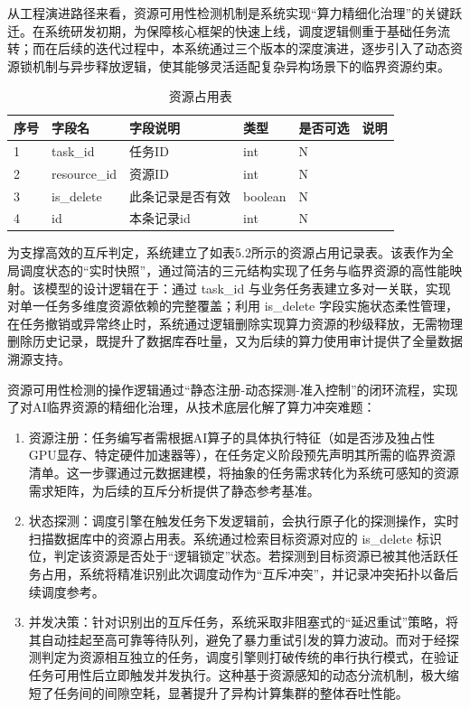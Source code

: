 从工程演进路径来看，资源可用性检测机制是系统实现“算力精细化治理”的关键跃迁。在系统研发初期，为保障核心框架的快速上线，调度逻辑侧重于基础任务流转；而在后续的迭代过程中，本系统通过三个版本的深度演进，逐步引入了动态资源锁机制与异步释放逻辑，使其能够灵活适配复杂异构场景下的临界资源约束。

\begin{table}[htbp]
    \centering
    \caption{资源占用表}
    \begin{tabular}{llllll}
        \toprule
        序号 & 字段名 & 字段说明 & 类型 & 是否可选 & 说明 \\
        \midrule
1 & task\_id & 任务ID & int & N &  \\
2 & resource\_id & 资源ID & int & N &  \\
3 & is\_delete & 此条记录是否有效 & boolean & N &  \\
4 & id & 本条记录id & int & N &  \\
        \bottomrule
    \end{tabular}
    \label{tab:my_label}
\end{table}

为支撑高效的互斥判定，系统建立了如表5.2所示的资源占用记录表。该表作为全局调度状态的“实时快照”，通过简洁的三元结构实现了任务与临界资源的高性能映射。该模型的设计逻辑在于：通过 task\_id 与业务任务表建立多对一关联，实现对单一任务多维度资源依赖的完整覆盖；利用 is\_delete 字段实施状态柔性管理，在任务撤销或异常终止时，系统通过逻辑删除实现算力资源的秒级释放，无需物理删除历史记录，既提升了数据库吞吐量，又为后续的算力使用审计提供了全量数据溯源支持。

资源可用性检测的操作逻辑通过“静态注册-动态探测-准入控制”的闭环流程，实现了对AI临界资源的精细化治理，从技术底层化解了算力冲突难题：

\begin{enumerate}
    \item 资源注册：任务编写者需根据AI算子的具体执行特征（如是否涉及独占性GPU显存、特定硬件加速器等），在任务定义阶段预先声明其所需的临界资源清单。这一步骤通过元数据建模，将抽象的任务需求转化为系统可感知的资源需求矩阵，为后续的互斥分析提供了静态参考基准。
    \item 状态探测：调度引擎在触发任务下发逻辑前，会执行原子化的探测操作，实时扫描数据库中的资源占用表。系统通过检索目标资源对应的 is\_delete 标识位，判定该资源是否处于“逻辑锁定”状态。若探测到目标资源已被其他活跃任务占用，系统将精准识别此次调度动作为“互斥冲突”，并记录冲突拓扑以备后续调度参考。
    \item 并发决策：针对识别出的互斥任务，系统采取非阻塞式的“延迟重试”策略，将其自动挂起至高可靠等待队列，避免了暴力重试引发的算力波动。而对于经探测判定为资源相互独立的任务，调度引擎则打破传统的串行执行模式，在验证任务可用性后立即触发并发执行。这种基于资源感知的动态分流机制，极大缩短了任务间的间隙空耗，显著提升了异构计算集群的整体吞吐性能。
\end{enumerate}

